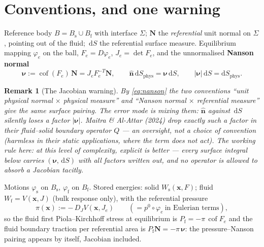 \documentclass[11pt]{article}
\newtheorem{remark}{Remark}
\newcommand{\Bs}{B_{\mathrm{s}}}
\newcommand{\Bf}{B_{\mathrm{f}}}
\newcommand{\bnu}{\bm{\nu}}
\newcommand{\bN}{\mathbf{N}}
\newcommand{\bx}{\mathbf{x}}
\newcommand{\dS}{\,\mathrm{d}S}
\newcommand{\cof}{\operatorname{cof}}
\begin{document}
\section{Conventions, and one warning}
\label{sec:conv}

Reference body $B = \Bs \cup \Bf$ with interface $\Sigma$; $\bN$ the
\emph{referential} unit normal on $\Sigma$, pointing out of the fluid;
$\dS$ the referential surface measure. Equilibrium mapping
$\varphi_e$ on the ball, $F_e = D\varphi_e$, $J_e = \det F_e$, and the
unnormalised \textbf{Nanson normal}
\begin{equation}
  \bnu := \cof(F_e)\,\bN = J_e F_e^{-T}\bN,
  \qquad
  \hat{\mathbf{n}}\,\mathrm{d}S_{\mathrm{phys}} = \bnu \dS,
  \qquad
  |\bnu|\dS = \mathrm{d}S_{\mathrm{phys}} .
  \label{eq:nanson}
\end{equation}

\begin{remark}[The Jacobian warning]\label{rem:jacobian}
By \eqref{eq:nanson} the two conventions ``unit physical normal
$\times$ physical measure'' and ``Nanson normal $\times$ referential
measure'' give the \emph{same} surface pairing. The error mode is
mixing them: $\hat{\mathbf{n}}$ against $\dS$ silently loses a factor
$|\bnu|$. Maitra \& Al-Attar (2024) drop exactly such a factor in
their fluid--solid boundary operator $Q$ --- an oversight, not a
choice of convention (harmless in their static applications, where the
term does not act). The working rule here: at this level of
complexity, \emph{explicit is better} --- every surface integral below
carries $(\bnu, \dS)$ with all factors written out, and no operator is
allowed to absorb a Jacobian tacitly.
\end{remark}

Motions $\varphi_{\mathrm{s}}$ on $\Bs$, $\varphi_{\mathrm{f}}$ on
$\Bf$. Stored energies: solid $W_{\mathrm{s}}(\bx, F)$; fluid
$W_{\mathrm{f}} = V(\bx, J)$ (bulk response only), with the referential
pressure
\begin{equation}
  \pi(\bx) := -\,D_J V(\bx, J_e)
  \qquad (= p^0 \circ \varphi_e \ \text{in Eulerian terms}),
\end{equation}
so the fluid first Piola--Kirchhoff stress at equilibrium is
$P_{\mathrm{f}} = -\pi\,\cof F_e$ and the fluid boundary traction per
referential area is $P_{\mathrm{f}}\bN = -\pi\,\bnu$: the
pressure--Nanson pairing appears by itself, Jacobian included.
\end{document}
